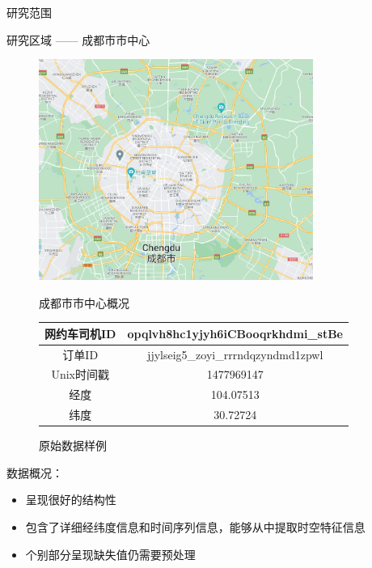 \documentclass[10pt]{beamer}
\begin{document}
\begin{frame}{研究范围}
\par 研究区域 —— 成都市市中心
   \begin{figure}[htb] 
        \centering
        \begin{minipage}[b]{0.4\textwidth} 
        \includegraphics[width=0.8\textwidth]{pic/map.png} 
        \caption{成都市市中心概况} 
        \label{fig.map} 
        \end{minipage}%
        \begin{minipage}[b]{0.6\textwidth} 
        \footnotesize
        \centering
        \begin{tabular}{|c|c|} \hline 
        网约车司机ID & opqlvh8hc1yjyh6iCBooqrkhdmi_stBe \\ \hline
        订单ID    & jjylseig5_zoyi_rrrndqzyndmd1zpwl  \\ \hline
        Unix时间戳   & 1477969147 \\ \hline
        经度 & 104.07513 \\ \hline
        纬度  & 30.72724 \\ \hline 
        \end{tabular} 
        \caption{原始数据样例} 
        \label{table:by:fig} 
        \end{minipage} 
    \end{figure} 
\par 数据概况：
\begin{itemize}
        \item 呈现很好的\alert{结构性}
        \item 包含了详细经纬度信息和时间序列信息，能够从中提取\alert{时空特征信息}
        \item 个别部分呈现\alert{缺失值}仍需要预处理
\end{itemize}
\end{frame}
\end{document}
